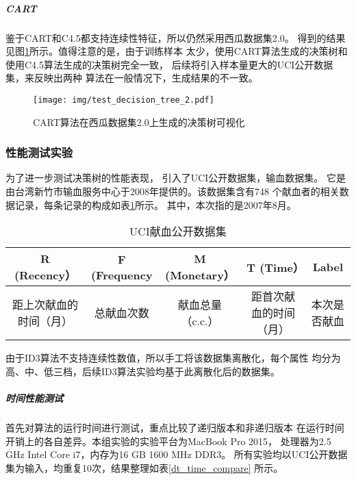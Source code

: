 \documentclass[main.tex]{subfiles}
\begin{document}
\subparagraph{CART}
鉴于CART和C4.5都支持连续性特征，所以仍然采用西瓜数据集2.0。
得到的结果见图\ref{dt_cart_vis}所示。值得注意的是，由于训练样本
太少，使用CART算法生成的决策树和使用C4.5算法生成的决策树完全一致，
后续将引入样本量更大的UCI公开数据集，来反映出两种
算法在一般情况下，生成结果的不一致。

\begin{figure}[htbp!]
    \centering \texttt{[image: img/test\_decision\_tree\_2.pdf]} 
    \caption{CART算法在西瓜数据集2.0上生成的决策树可视化}
    \label{dt_cart_vis}
\end{figure}

\subsubsection{性能测试实验}
为了进一步测试决策树的性能表现，
引入了UCI公开数据集，输血数据集\cite{yeh2009knowledge}。
它是由台湾新竹市输血服务中心于2008年提供的。该数据集含有748
个献血者的相关数据记录，每条记录的构成如表\ref{uci_blood}所示。
其中，本次指的是2007年8月。

\begin{table}[]
    \caption{UCI献血公开数据集}
    \label{uci_blood}
    \centering
    \begin{tabular}{ccccc}
    \hline
    R (Recency） & F (Frequency & M (Monetary） & T (Time）    & Label                  \\ \hline
    距上次献血的时间（月） & 总献血次数        & 献血总量（c.c.）   & 距首次献血的时间（月） & 本次是否献血 \\ \hline
    \end{tabular}
\end{table}

由于ID3算法不支持连续性数值，所以手工将该数据集离散化，每个属性
均分为高、中、低三档，后续ID3算法实验均基于此离散化后的数据集。

\subparagraph{时间性能测试}
首先对算法的运行时间进行测试，重点比较了递归版本和非递归版本
在运行时间开销上的各自差异。本组实验的实验平台为MacBook Pro 2015，
处理器为2.5 GHz Intel Core i7，内存为16 GB 1600 MHz DDR3。
所有实验均以UCI公开数据集为输入，均重复10次，结果整理如表\ref{dt_time_compare}
所示。
\end{document}
